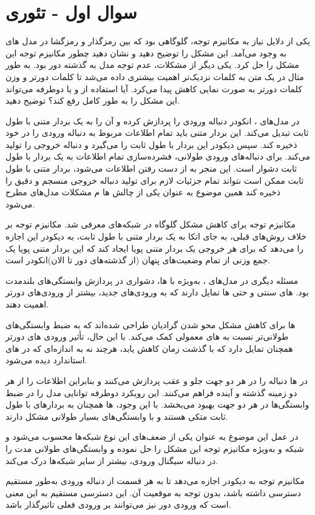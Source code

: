 \section{سوال اول - تئوری}

یکی از دلایل نیاز به مکانیزم توجه، گلوگاهی بود که بین رمزگذار و رمزگشا در مدل های  به وجود می‌آمد. این مشکل را توضیح دهید و نشان دهید چطور مکانیزم توجه این مشکل را حل کرد. یکی دیگر از مشکلات، عدم توجه مدل به گذشته دور بود. به طور مثال در یک متن به کلمات نزدیک‌تر اهمیت بیشتری داده می‌شد تا کلمات دورتر و وزن کلمات دورتر به صورت نمایی کاهش پیدا می‌کرد. آیا استفاده از  و یا  دوطرفه می‌تواند این مشکل را به طور کامل رفع کند؟ توضیح دهید.
	




\begin{qsolve}
در مدل‌های ، انکودر دنباله ورودی را پردازش کرده و آن را به یک بردار متنی با طول ثابت تبدیل می‌کند. این بردار متنی باید تمام اطلاعات مربوط به دنباله ورودی را در خود ذخیره کند.
سپس دیکودر این بردار با طول ثابت را می‌گیرد و دنباله خروجی را تولید می‌کند. برای دنباله‌های ورودی طولانی، فشرده‌سازی تمام اطلاعات به یک بردار با طول ثابت دشوار است. این منجر به از دست رفتن اطلاعات می‌شود، بردار متنی با طول ثابت ممکن است نتواند تمام جزئیات لازم برای تولید دنباله خروجی منسجم و دقیق را ذخیره کند همین موضوع به عنوان یکی از چالش ها م مشکلات مدل‌های  مطرح می‌شود.

مکانیزم توجه برای کاهش مشکل گلوگاه در شبکه‌های  معرفی شد. مکانیزم توجه بر خلاف روش‌های قبلی، به جای اتکا به یک بردار متنی با طول ثابت، به دیکودر این اجازه را می‌دهد که برای هر خروجی یک بردار متنی پویا ایجاد کند که این بردار متنی پویا یک جمع وزنی از تمام وضعیت‌های پنهان (از گذشته‌های دور تا الان)انکودر است.

مسئله دیگری در مدل‌های ، به‌ویژه با ها، دشواری در پردازش وابستگی‌های بلندمدت بود. های سنتی و حتی ها تمایل دارند که به ورودی‌های جدید، بیشتر از ورودی‌های دورتر اهمیت دهند. 

ها برای کاهش مشکل محو شدن گرادیان طراحی شده‌اند که به ضبط وابستگی‌های طولانی‌تر نسبت به های معمولی کمک می‌کند. با این حال، تأثیر ورودی های دورتر همچنان تمایل دارد که با گذشت زمان کاهش یابد، هرچند نه به اندازه‌ای که در های استاندارد دیده می‌شود.

در ها دنباله را در هر دو جهت جلو و عقب پردازش می‌کنند و بنابراین اطلاعات را از هر دو زمینه گذشته و آینده فراهم می‌کنند.
این رویکرد دوطرفه توانایی مدل را در ضبط وابستگی‌ها در هر دو جهت بهبود می‌بخشد.
با این وجود، ها همچنان به بردارهای با طول ثابت متکی هستند و با وابستگی‌های بسیار طولانی مشکل دارند.

در عمل این موضوع به عنوان یکی از ضعف‌های این نوع شبکه‌ها محسوب می‌شود و شبکه  و به‌ویژه مکانیزم توجه این مشکل را حل نموده و وابستگی‌های طولانی مدت را در دنباله سیگنال ورودی، بیشتر از سایر شبکه‌ها درک می‌کند.

مکانیزم توجه به دیکودر اجازه می‌دهد تا به هر قسمت از دنباله ورودی به‌طور مستقیم دسترسی داشته باشد، بدون توجه به موقعیت آن. این دسترسی مستقیم به این معنی است که ورودی دور نیز می‌توانند بر ورودی فعلی تاثیرگذار باشد.
	
\end{qsolve}